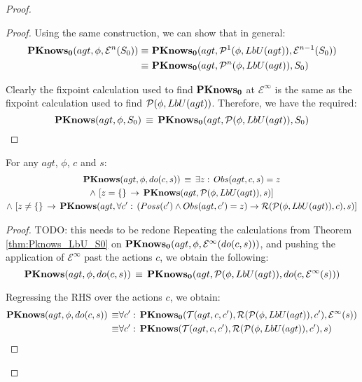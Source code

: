 \begin{proof}
\begin{ned}
\begin{proof}
Using the same construction, we can show that in general:\begin{align*}
\mathbf{PKnows_{0}}(agt,\phi,\mathcal{E}^{n}(S_{0}))\equiv\,\, & \mathbf{PKnows_{0}}(agt,\mathcal{P}^{1}(\phi,LbU(agt)),\mathcal{E}^{n-1}(S_{0}))\\
\equiv\,\, & \mathbf{PKnows_{0}}(agt,\mathcal{P}^{n}(\phi,LbU(agt)),S_{0})\end{align*}


Clearly the fixpoint calculation used to find $\mathbf{PKnows_{0}}$ at $\mathcal{E}^{\infty}$
is the same as the fixpoint calculation used to find $\mathcal{P}(\phi,LbU(agt))$.
Therefore, we have the required:\[
\mathbf{PKnows}(agt,\phi,S_{0})\,\equiv\,\mathbf{PKnows_{0}}(agt,\mathcal{P}(\phi,LbU(agt)),S_{0})\]

\end{proof}
\medskip{}


\begin{lemmaext}
[{{[}{\ref{thm:Pknows_LbU_do}}]}] For any $agt$, $\phi$, $c$
and $s$:\begin{multline*}
\mathbf{PKnows}(agt,\phi,do(c,s))\,\equiv\,\exists z:\, Obs(agt,c,s)=z\\
\wedge\,\left[z=\{\}\,\rightarrow\,\mathbf{PKnows}(agt,\mathcal{P}(\phi,LbU(agt)),s)\right]\\
\wedge\,\left[z\neq\{\}\,\rightarrow\,\mathbf{PKnows}(agt,\forall c':\,\left(Poss(c')\wedge Obs(agt,c')=z\right)\rightarrow\mathcal{R}(\mathcal{P}(\phi,LbU(agt)),c),s)\right]\end{multline*}

\end{lemmaext}
\begin{proof}
TODO: this needs to be redone
Repeating the calculations from Theorem \ref{thm:Pknows_LbU_S0} on
$\mathbf{PKnows_{0}}(agt,\phi,\mathcal{E}^{\infty}(do(c,s)))$, and pushing the
application of $\mathcal{E}^{\infty}$ past the actions $c$, we obtain
the following:\[
\mathbf{PKnows}(agt,\phi,do(c,s))\,\equiv\,\mathbf{PKnows_{0}}(agt,\mathcal{P}(\phi,LbU(agt)),do(c,\mathcal{E}^{\infty}(s)))\]


Regressing the RHS over the actions $c$, we obtain:\begin{align*}
\mathbf{PKnows}(agt,\phi,do(c,s))\,\equiv & \forall c':\,\mathbf{PKnows_{0}}(\mathcal{T}(agt,c,c'),\mathcal{R}(\mathcal{P}(\phi,LbU(agt)),c'),\mathcal{E}^{\infty}(s))\\
\equiv & \forall c':\,\mathbf{PKnows}(\mathcal{T}(agt,c,c'),\mathcal{R}(\mathcal{P}(\phi,LbU(agt)),c'),s)\end{align*}



\end{proof}
\end{ned}
\end{proof}
